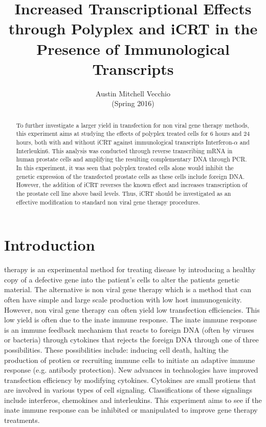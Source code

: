 \documentclass[journal, a4paper]{IEEEtran}
\begin{document}
\title{Increased Transcriptional Effects through Polyplex and iCRT in the Presence of Immunological Transcripts}
\author{Austin Mitchell Vecchio \\ (Spring 2016)}
\maketitle

\begin{abstract}
  To further investigate a larger yield in transfection for non viral gene therapy methods, this experiment
  aims at studying the effects of polyplex treated cells for 6 hours and 24 hours, both with and without iCRT
  against immunological transcripts Interferon-$\alpha$ and Interleukin6. This analysis was conducted through
  reverse transcribing mRNA in human prostate cells and amplifying the resulting complementary DNA through PCR.
  In this experiment, it was seen that polyplex treated cells alone would inhibit the genetic expression of
  the transfected prostate cells as these cells include foreign DNA. However, the addition of iCRT reverses
  the known effect and increases transcription of the prostate cell line above basil levels. Thus, iCRT should
  be investigated as an effective modification to standard non viral gene therapy procedures.

\end{abstract}

\section{Introduction}
   therapy is an experimental method for treating disease by introducing a healthy copy of a
  defective gene into the patient's cells to alter the patients genetic material.
  The alternative is  non viral gene therapy which is a method that can often have simple and large scale production
  with low host immunogenicity. However, non viral gene therapy can often yield low transfection efficiencies.
  This low yield is often due to the inate immune response. The inate immune response is an immune feedback mechanism
  that reacts to foreign DNA (often by viruses or bacteria) through cytokines that rejects the foreign DNA through one of three possibilities.
  These possibilities include: inducing cell death, halting the production of protien or recruiting immune cells to initiate an adaptive immune
  response (e.g. antibody protection). New advances in technologies have improved transfection efficiency by modifying cytokines. Cytokines
  are small protiens that are involved in various types of cell signaling. Classifications of these signalings
  include interferos, chemokines and interleukins. This experiment aims to see if the inate immune response can be inhibited or manipulated
  to improve gene therapy treatments.
\end{document}
